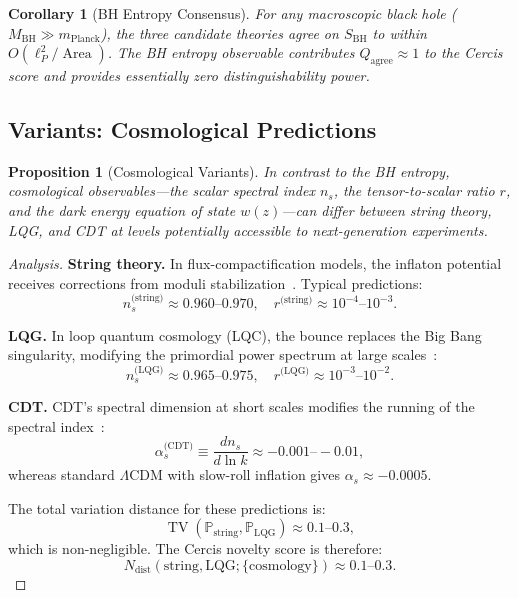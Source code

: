 \documentclass[12pt,a4paper]{article}
\newtheorem{proposition}[theorem]{Proposition}
\newtheorem{corollary}[theorem]{Corollary}
\theoremstyle{remark}
\newcommand{\Pbb}{\mathbb{P}}
\newcommand{\Cercis}{\textsf{Cercis}}
\DeclareMathOperator{\Area}{Area}
\DeclareMathOperator{\TV}{TV}
\begin{document}
\begin{corollary}[BH Entropy Consensus]
\label{cor:bh_consensus}
For any macroscopic black hole ($M_{\text{BH}} \gg m_{\text{Planck}}$), the three candidate theories agree on $S_{\text{BH}}$ to within $O(\ell_P^2 / \Area)$. The BH entropy observable contributes $Q_{\text{agree}} \approx 1$ to the \Cercis{} score and provides essentially zero distinguishability power.
\end{corollary}

\subsection{Variants: Cosmological Predictions}

\begin{proposition}[Cosmological Variants]
\label{prop:cosmo_variant}
In contrast to the BH entropy, cosmological observables---the scalar spectral index $n_s$, the tensor-to-scalar ratio $r$, and the dark energy equation of state $w(z)$---can differ between string theory, LQG, and CDT at levels potentially accessible to next-generation experiments.
\end{proposition}

\begin{proof}[Analysis]
\smallskip
\noindent\textbf{String theory.} In flux-compactification models, the inflaton potential receives corrections from moduli stabilization~\cite{baumann2015inflation}. Typical predictions:
\begin{equation}
  n_s^{\text{(string)}} \approx 0.960\text{--}0.970, \quad
  r^{\text{(string)}} \approx 10^{-4}\text{--}10^{-3}.
\end{equation}

\noindent\textbf{LQG.} In loop quantum cosmology (LQC), the bounce replaces the Big Bang singularity, modifying the primordial power spectrum at large scales~\cite{ashtekar2006quantum}:
\begin{equation}
  n_s^{\text{(LQG)}} \approx 0.965\text{--}0.975, \quad
  r^{\text{(LQG)}} \approx 10^{-3}\text{--}10^{-2}.
\end{equation}

\noindent\textbf{CDT.} CDT's spectral dimension at short scales modifies the running of the spectral index~\cite{ambjorn2005spectral}:
\begin{equation}
  \alpha_s^{\text{(CDT)}} \equiv \frac{d n_s}{d \ln k} \approx -0.001\text{--}-0.01,
\end{equation}
whereas standard $\Lambda$CDM with slow-roll inflation gives $\alpha_s \approx -0.0005$.

The total variation distance for these predictions is:
\begin{equation}
  \TV(\Pbb_{\text{string}}, \Pbb_{\text{LQG}}) \approx 0.1\text{--}0.3,
\end{equation}
which is non-negligible. The \Cercis{} novelty score is therefore:
\begin{equation}
  N_{\text{dist}}(\text{string}, \text{LQG}; \{\text{cosmology}\}) \approx 0.1\text{--}0.3.
\end{equation}
\end{proof}
\end{document}

